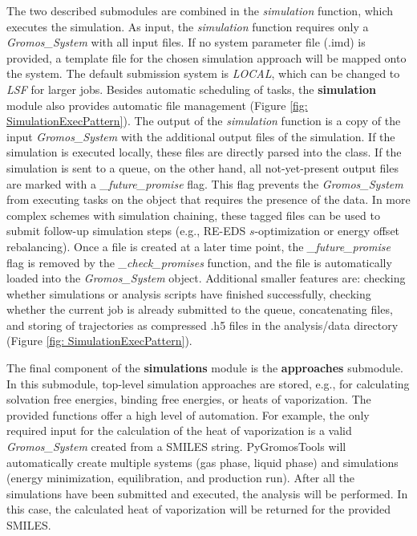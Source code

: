The two described submodules are combined in the \textit{simulation} function, which executes the simulation. As input, the \textit{simulation} function requires only a \textit{Gromos\_System} with all input files. If no system parameter file (.imd) is provided, a template file for the chosen simulation approach will be mapped onto the system. The default submission system is \textit{LOCAL}, which can be changed to \textit{LSF} for larger jobs. Besides automatic scheduling of tasks, the \textbf{simulation} module also provides automatic file management (Figure \ref{fig: SimulationExecPattern}). The output of the \textit{simulation} function is a copy of the input \textit{Gromos\_System} with the additional output files of the simulation. If the simulation is executed locally, these files are directly parsed into the class. If the simulation is sent to a queue, on the other hand, all not-yet-present output files are marked with a \textit{\_future\_promise} flag. This flag prevents the \textit{Gromos\_System} from executing tasks on the object that requires the presence of the data. In more complex schemes with simulation chaining, these tagged files can be used to submit follow-up simulation steps (e.g., RE-EDS $s$-optimization or energy offset rebalancing\cite{Ries2021B}). Once a file is created at a later time point, the \textit{\_future\_promise} flag is removed by the \textit{\_check\_promises} function, and the file is automatically loaded into the \textit{Gromos\_System} object.
Additional smaller features are: checking whether simulations or analysis scripts have finished successfully, checking whether the current job is already submitted to the queue, concatenating files, and storing of trajectories as compressed .h5 files in the analysis/data directory (Figure \ref{fig: SimulationExecPattern}).

The final component of the \textbf{simulations} module is the \textbf{approaches} submodule. In this submodule, top-level simulation approaches are stored, e.g., for calculating solvation free energies, binding free energies, or heats of vaporization. The provided functions offer a high level of automation. For example, the only required input for the calculation of the heat of vaporization is a valid \textit{Gromos\_System} created from a SMILES string. PyGromosTools will automatically create multiple systems (gas phase, liquid phase) and simulations (energy minimization, equilibration, and production run). After all the simulations have been submitted and executed, the analysis will be performed. In this case, the calculated heat of vaporization will be returned for the provided SMILES.


